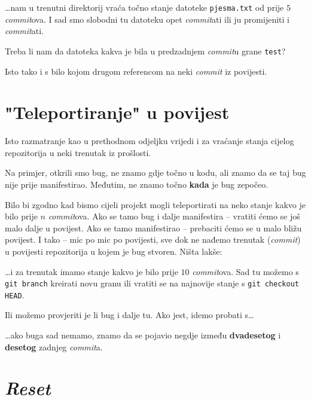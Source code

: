 
\dots{}nam u trenutni direktorij vraća točno stanje datoteke \verb+pjesma.txt+ od prije $5$ \emph{commit}ova.
I sad smo slobodni tu datoteku opet \emph{commit}ati ili ju promijeniti i \emph{commit}ati.

Treba li nam da datoteka kakva je bila u predzadnjem \emph{commit}u grane \verb+test+?


Isto tako i s bilo kojom drugom referencom na neki \emph{commit} iz povijesti.

\section*{"Teleportiranje" u povijest}

Isto razmatranje kao u prethodnom odjeljku vrijedi i za vraćanje stanja cijelog repozitorija u neki trenutak iz prošlosti.

Na primjer, otkrili smo bug, ne znamo gdje točno u kodu, ali znamo da se taj bug nije prije manifestirao. 
Međutim, ne znamo točno \textbf{kada} je bug zepočeo.

Bilo bi zgodno kad bismo cijeli projekt mogli teleportirati na neko stanje kakvo je bilo prije $n$ \emph{commit}ova.
Ako se tamo bug i dalje manifestira -- vratiti ćemo se još malo dalje u povijest.
Ako se tamo manifestirao -- prebaciti ćemo se u malo bližu povijest.
I tako -- mic po mic po povijesti, sve dok ne nađemo trenutak (\emph{commit}) u povijesti repozitorija u kojem je bug stvoren.
Ništa lakše:


\dots{}i za trenutak imamo stanje kakvo je bilo prije $10$ \emph{commit}ova. Sad tu možemo s \verb+git branch+ kreirati novu granu ili vratiti se na najnovije stanje s \verb+git checkout HEAD+.

Ili možemo provjeriti je li bug i dalje tu. Ako jest, idemo probati s\dots


\dots{}ako buga sad nemamo, znamo da se pojavio negdje između \textbf{dvadesetog} i \textbf{desetog} zadnjeg \emph{commit}a.

\section*{\emph{Reset}}

